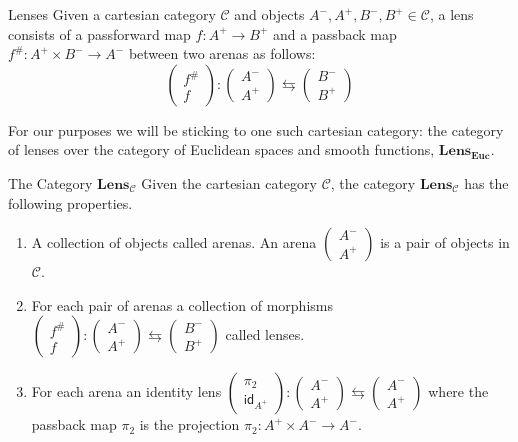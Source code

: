 \documentclass[12pt]{article}
\begin{document}
\begin{definition}{Lenses}{}
    Given a cartesian category $\mathcal{C}$ and objects $A^-, A^+, B^-, B^+ \in\mathcal{C}$, a lens consists of a passforward map $f:A^+\rightarrow B^+$ and a passback map $f^\#:A^+ \times B^- \rightarrow A^-$ between two arenas as follows:
    \[
        \begin{pmatrix}f^{\#}\\f\end{pmatrix}:\begin{pmatrix}A^-\\A^+\end{pmatrix}\leftrightarrows\begin{pmatrix}B^-\\B^+\end{pmatrix}
    \]
\end{definition}

For our purposes we will be sticking to one such cartesian category: the category of lenses over the category of Euclidean spaces and smooth functions, $\textbf{Lens}_\textbf{Euc}$.

\begin{definition}{The Category $\textbf{Lens}_\mathcal{C}$}{}
    Given the cartesian category $\mathcal{C}$, the category $\textbf{Lens}_{\mathcal{C}}$ has the following properties.
    \begin{enumerate}
        \item A collection of objects called arenas. An arena $\begin{pmatrix}A^-\\A^+\end{pmatrix}$ is a pair of objects in $\mathcal{C}$.
        \item For each pair of arenas a collection of morphisms $\begin{pmatrix}f^{\#}\\f\end{pmatrix}:\begin{pmatrix}A^-\\A^+\end{pmatrix}\leftrightarrows\begin{pmatrix}B^-\\B^+\end{pmatrix}$ called lenses.
        \item For each arena an identity lens $\begin{pmatrix}\pi_2\\\mathsf{id}_{A^+}\end{pmatrix}:\begin{pmatrix}A^-\\A^+\end{pmatrix}\leftrightarrows\begin{pmatrix}A^-\\A^+\end{pmatrix}$ where the passback map $\pi_2$ is the projection $\pi_2:A^+ \times A^- \rightarrow A^-$.
    \end{enumerate}
\end{definition}
\end{document}
